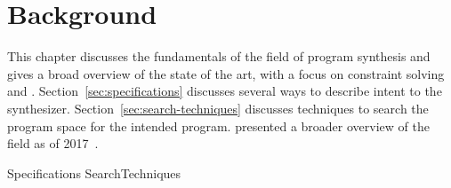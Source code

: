 \chapter{Background}
\label{chapter:background}

This chapter discusses the fundamentals of the field of program synthesis and
gives a broad overview of the state of the art, with a focus on constraint
solving and .
Section~\ref{sec:specifications} discusses several ways to describe intent to
the synthesizer.
Section~\ref{sec:search-techniques} discusses techniques to search the program
space for the intended program.
\citeauthor{Gulwani2017} presented a broader overview of the field as of
2017~\cite{Gulwani2017}.

{Specifications}
{SearchTechniques}